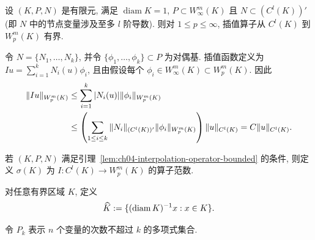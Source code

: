 \begin{Lemma}
\label{lem:ch04-interpolation-operator-bounded}
设 $(K,P,N)$ 是有限元, 满足 $\operatorname{diam}K=1$, $P\subset W_\infty^m(K)$ 且 $N\subset(C^l(K))'$ (即 $N$ 中的节点变量涉及至多 $l$ 阶导数). 则对 $1\leq p\leq\infty$, 插值算子从 $C^l(K)$ 到 $W_p^m(K)$ 有界.
\end{Lemma}
\begin{Proof}
令 $N=\{N_1,\ldots,N_k\}$, 并令 $\{\phi_1,\ldots,\phi_k\}\subset P$ 为对偶基. 插值函数定义为 $Iu=\sum_{i=1}^kN_i(u)\phi_i$, 且由假设每个 $\phi_i\in W_\infty^m(K)\subset W_p^m(K)$. 因此
\[
\MathBookFormulaID{formula-ch04-interpolation-operator-bounded-proof}
\begin{aligned}
\|Iu\|_{W_p^m(K)}
&\leq\sum_{i=1}^k|N_i(u)|\|\phi_i\|_{W_p^m(K)}\\
&\leq\left(\sum_{1\leq i\leq k}\|N_i\|_{(C^l(K))'}\|\phi_i\|_{W_p^m(K)}\right)
\|u\|_{C^l(K)}
=C\|u\|_{C^l(K)}.
\end{aligned}
\]
\end{Proof}

\begin{Definition}
\label{def:ch04-interpolation-operator-norm}
若 $(K,P,N)$ 满足引理~\ref{lem:ch04-interpolation-operator-bounded} 的条件, 则定义 $\sigma(K)$ 为 $I:C^l(K)\to W_p^m(K)$ 的算子范数.
\end{Definition}

\begin{Definition}
\label{def:ch04-normalized-region}
对任意有界区域 $K$, 定义
\[
\MathBookFormulaID{formula-ch04-normalized-region}
\widehat K:=\{(\operatorname{diam}K)^{-1}x:x\in K\}.
\]
\end{Definition}

令 $P_k$ 表示 $n$ 个变量的次数不超过 $k$ 的多项式集合.


